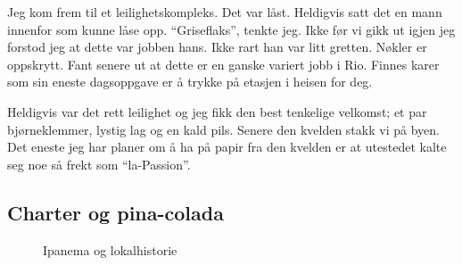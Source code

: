 Jeg kom frem til et leilighetskompleks. Det var låst. Heldigvis
satt det en mann innenfor som kunne låse opp. ``Griseflaks'', tenkte jeg.
Ikke før vi gikk ut igjen jeg forstod jeg at dette var jobben hans. Ikke
rart han var litt gretten. Nøkler
er oppskrytt. Fant senere ut at dette er en ganske variert jobb i Rio.
Finnes karer som sin eneste dagsoppgave er å trykke på etasjen i
heisen for deg. 

Heldigvis var det rett leilighet og jeg fikk den best tenkelige
velkomst; et par
bjørneklemmer, lystig lag og en kald pils. Senere den kvelden stakk
vi på byen. Det eneste jeg har planer om å ha på papir fra den
kvelden er at utestedet kalte seg noe så frekt som ``la-Passion''.
\clearpage



\subsection{Charter og pina-colada}
\begin{figure}[h]
	\centering
	\noindent{}
	\caption*{Ipanema og lokalhistorie}
\label{fig:mengelezoo}

\end{figure}

